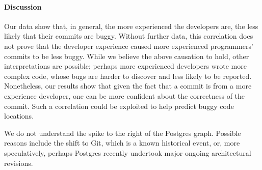 \paragraph{Discussion}
Our data show that, in general, the more experienced the developers are, the less likely that their commits are buggy.
Without further data, this correlation does not prove that the developer experience caused more 
experienced programmers' commits to be less buggy. 
While we believe the above causation to hold, other interpretations are possible; perhaps more experienced developers wrote 
more complex code, whose bugs are harder to discover and less likely to be reported. 
Nonetheless, our results show that given the fact that a commit is from a more experience developer, 
one can be more confident about the correctness of the commit. Such a correlation could be exploited 
to help predict buggy code locations.

We do not understand the spike to the right of the Postgres graph.
Possible reasons include the shift to Git, which is a known historical
event, or, more speculatively, perhaps Postgres recently undertook
major ongoing architectural revisions.




